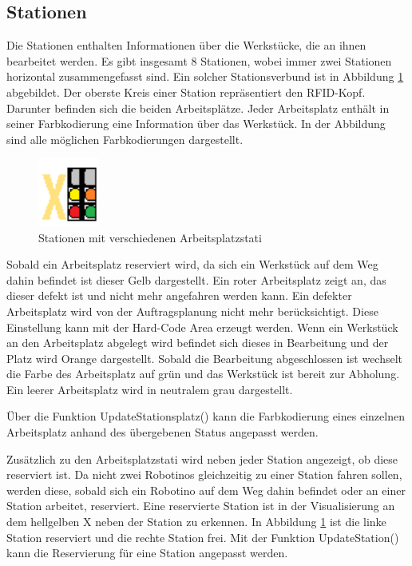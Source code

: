\subsection{Stationen}

Die Stationen enthalten Informationen über die Werkstücke, die an ihnen bearbeitet werden. Es gibt insgesamt 8 Stationen, wobei immer zwei Stationen horizontal zusammengefasst sind. Ein solcher Stationsverbund ist in Abbildung \ref{fig:Station} abgebildet. Der oberste Kreis einer Station repräsentiert den RFID-Kopf. Darunter befinden sich die beiden Arbeitsplätze. Jeder Arbeitsplatz enthält in seiner Farbkodierung eine Information über das Werkstück. In der Abbildung sind alle möglichen Farbkodierungen dargestellt.

\begin{figure}[htb]
    \centering
    \includegraphics[width=0.18\textwidth]{Abbildungen/Station.png}
    \caption{Stationen mit verschiedenen Arbeitsplatzstati}		
    \label{fig:Station}
\end{figure}

Sobald ein Arbeitsplatz reserviert wird, da sich ein Werkstück auf dem Weg dahin befindet ist dieser Gelb dargestellt. Ein roter Arbeitsplatz zeigt an, das dieser defekt ist und nicht mehr angefahren werden kann. Ein defekter Arbeitsplatz wird von der Auftragsplanung nicht mehr berücksichtigt. Diese Einstellung kann mit der Hard-Code Area erzeugt werden. Wenn ein Werkstück an den Arbeitsplatz abgelegt wird befindet sich dieses in Bearbeitung und der Platz wird Orange dargestellt. Sobald die Bearbeitung abgeschlossen ist wechselt die Farbe des Arbeitsplatz auf grün und das Werkstück ist bereit zur Abholung. Ein leerer Arbeitsplatz wird in neutralem grau dargestellt. 

Über die Funktion UpdateStationsplatz() kann die Farbkodierung eines einzelnen Arbeitsplatz anhand des übergebenen Status angepasst werden. 

Zusätzlich zu den Arbeitsplatzstati wird neben jeder Station angezeigt, ob diese reserviert ist. Da nicht zwei Robotinos gleichzeitig zu einer Station fahren sollen, werden diese, sobald sich ein Robotino auf dem Weg dahin befindet oder an einer Station arbeitet, reserviert. Eine reservierte Station ist in der Visualisierung an dem hellgelben X neben der Station zu erkennen. In Abbildung \ref{fig:Station} ist die linke Station reserviert und die rechte Station frei. Mit der Funktion UpdateStation() kann die Reservierung für eine Station angepasst werden. 

